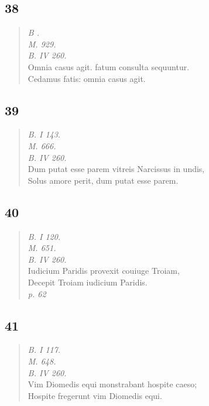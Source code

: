 \documentclass[11pt, a4paper]{report}
\begin{document}
            \subsection*{38}
      \begin{verse}
      \textit{B .} \\ \textit{M. 929.} \\ \textit{B. IV 260.} \\ Omnia casus agit. fatum consulta sequuntur. \\ Cedamus fatis: omnia casus agit. \\ 
      \end{verse}
  
            \subsection*{39}
      \begin{verse}
      \textit{B. I 143.} \\ \textit{M. 666.} \\ \textit{B. IV 260.} \\ Dum putat esse parem vitreis Narcissus in undis, \\ Solus amore perit, dum putat esse parem. \\ 
      \end{verse}
  
            \subsection*{40}
      \begin{verse}
      \textit{B. I 120.} \\ \textit{M. 651.} \\ \textit{B. IV 260.} \\ Iudicium Paridis provexit couiuge Troiam, \\ Decepit Troiam iudicium Paridis. \\ \textit{p. 62} \\ 
      \end{verse}
  
            \subsection*{41}
      \begin{verse}
      \textit{B. I 117.} \\ \textit{M. 648.} \\ \textit{B. IV 260.} \\ Vim Diomedis equi monstrabant hospite caeso; \\ Hospite fregerunt vim Diomedis equi. \\ 
      \end{verse}
  
\end{document}
